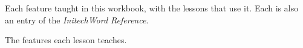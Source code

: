 Each feature taught in this workbook, with the lessons that use it.  Each is
also an entry of the \textit{InitechWord Reference}.
\par\addvspace{6pt}
\FeatureListAlpha

The features each lesson teaches.
\par\addvspace{6pt}
\FeatureListByLesson
